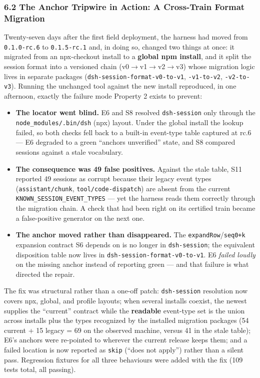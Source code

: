 \documentclass[
]{article}
\providecommand{\tightlist}{%
  \setlength{\itemsep}{0pt}\setlength{\parskip}{0pt}}
\begin{document}
\subsubsection{6.2 The Anchor Tripwire in Action: A Cross-Train Format Migration}\label{the-anchor-tripwire-in-action-a-cross-train-format-migration}

Twenty-seven days after the first field deployment, the harness had moved from
\texttt{0.1.0-rc.6} to \texttt{0.1.5-rc.1} and, in doing so, changed two
things at once: it migrated from an npx-checkout install to a \textbf{global npm
install}, and it split the session format into a versioned chain
(v0$\rightarrow$v1$\rightarrow$v2$\rightarrow$v3) whose migration logic lives in
separate packages (\texttt{dsh-session-format-v0-to-v1},
\texttt{-v1-to-v2}, \texttt{-v2-to-v3}). Running the unchanged tool against the
new install reproduced, in one afternoon, exactly the failure mode Property 2
exists to prevent:

\begin{itemize}
\tightlist
\item
  \textbf{The locator went blind.} E6 and S8 resolved \texttt{dsh-session} only
  through the \texttt{node\_modules/.bin/dsh} (npx) layout. Under the global
  install the lookup failed, so both checks fell back to a built-in event-type
  table captured at rc.6 --- E6 degraded to a green ``anchors unverified''
  state, and S8 compared sessions against a stale vocabulary.
\item
  \textbf{The consequence was 49 false positives.} Against the stale table, S11
  reported 49 sessions as corrupt because their legacy event types
  (\texttt{assistant/chunk}, \texttt{tool/code-dispatch}) are absent from the
  current \texttt{KNOWN\_SESSION\_EVENT\_TYPES} --- yet the harness reads them
  correctly through the migration chain. A check that had been right on its
  certified train became a false-positive generator on the next one.
\item
  \textbf{The anchor moved rather than disappeared.} The
  \texttt{expandRow}/\texttt{seq0+k} expansion contract S6 depends on is no
  longer in \texttt{dsh-session}; the equivalent disposition table now lives in
  \texttt{dsh-session-format-v0-to-v1}. E6 \emph{failed loudly} on the missing
  anchor instead of reporting green --- and that failure is what directed the
  repair.
\end{itemize}

The fix was structural rather than a one-off patch: \texttt{dsh-session}
resolution now covers npx, global, and profile layouts; when several installs
coexist, the newest supplies the ``current'' contract while the
\textbf{readable} event-type set is the union across installs plus the types
recognized by the installed migration packages (54 current + 15 legacy = 69 on
the observed machine, versus 41 in the stale table); E6's anchors were
re-pointed to wherever the current release keeps them; and a failed location is
now reported as \texttt{skip} (``does not apply'') rather than a silent pass.
Regression fixtures for all three behaviours were added with the fix (109 tests
total, all passing).
\end{document}
